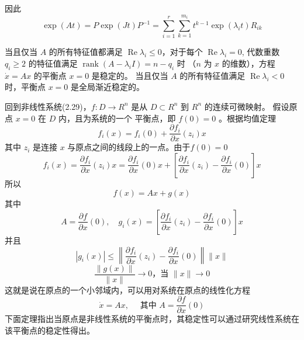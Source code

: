 因此
\begin{equation}
    \exp (A t)=P \exp (J t) P^{-1}=\sum_{i=1}^r \sum_{k=1}^{m_i} t^{k-1} \exp \left(\lambda_i t\right) R_{i k}
\end{equation}
\begin{theorem}
    当且仅当 $A$ 的所有特征值都满足 $\operatorname{Re} \lambda_i \leqslant 0$，对于每个 $\operatorname{Re} \lambda_i=0$,
    代数重数 $q_i \geqslant 2$ 的特征值满足 $\operatorname{rank}\left(A-\lambda_i I\right)=n-q_i$ 时
    （$n$ 为 $x$ 的维数），方程 $\dot{x}=A x$ 的平衡点 $x=0$ 是稳定的。 
    当且仅当 $A$ 的所有特征值满足 $\operatorname{Re} \lambda_i<0$ 时，平衡点 $x=0$ 是全局渐近稳定的。
\end{theorem}
回到非线性系统(2.29)，$f: D \rightarrow R^n$ 是从 $D \subset R^n$ 到 $R^n$ 的连续可微映射。
假设原点 $x=0$ 在 $D$ 内，且为系统的一个 平衡点，即 $f(0)=0$ 。根据均值定理
\begin{equation}
    f_i(x)=f_i(0)+\frac{\partial f_i}{\partial x}\left(z_i\right) x
\end{equation}
其中 $z_i$ 是连接 $x$ 与原点之间的线段上的一点。由于$f(0)=0$
\begin{equation}
    f_i(x)=\frac{\partial f_i}{\partial x}\left(z_i\right) x=\frac{\partial f_i}{\partial x}(0) x+\left[\frac{\partial f_i}{\partial x}\left(z_i\right)-\frac{\partial f_i}{\partial x}(0)\right] x
\end{equation}
所以
\begin{equation}
    f(x)=A x+g(x)
\end{equation}
其中
\begin{equation}
    A=\frac{\partial f}{\partial x}(0),\quad g_i(x)=\left[\frac{\partial f_i}{\partial x}\left(z_i\right)-\frac{\partial f_i}{\partial x}(0)\right] x
\end{equation}
并且
\begin{equation}
    \left|g_i(x)\right| \leqslant\left\|\frac{\partial f_i}{\partial x}\left(z_i\right)-\frac{\partial f_i}{\partial x}(0)\right\|\|x\|
\end{equation}
\begin{equation}
    \frac{\|g(x)\|}{\|x\|} \rightarrow 0 \text {，当 }\|x\| \rightarrow 0
\end{equation}
这就是说在原点的一个小邻域内，可以用对系统在原点的线性化方程
\begin{equation}
    \dot{x}=A x,\quad \text { 其中 } A=\frac{\partial f}{\partial x}(0)
\end{equation}
下面定理指出当原点是非线性系统的平衡点时，其稳定性可以通过研究线性系统在该平衡点的稳定性得出。
